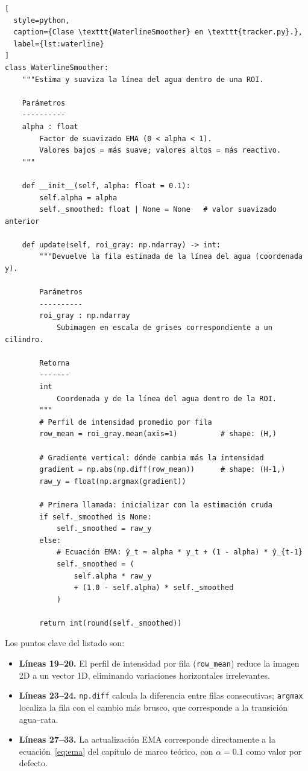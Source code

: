 \begin{lstlisting}[
  style=python,
  caption={Clase \texttt{WaterlineSmoother} en \texttt{tracker.py}.},
  label={lst:waterline}
]
class WaterlineSmoother:
    """Estima y suaviza la línea del agua dentro de una ROI.

    Parámetros
    ----------
    alpha : float
        Factor de suavizado EMA (0 < alpha < 1).
        Valores bajos = más suave; valores altos = más reactivo.
    """

    def __init__(self, alpha: float = 0.1):
        self.alpha = alpha
        self._smoothed: float | None = None   # valor suavizado anterior

    def update(self, roi_gray: np.ndarray) -> int:
        """Devuelve la fila estimada de la línea del agua (coordenada y).

        Parámetros
        ----------
        roi_gray : np.ndarray
            Subimagen en escala de grises correspondiente a un cilindro.

        Retorna
        -------
        int
            Coordenada y de la línea del agua dentro de la ROI.
        """
        # Perfil de intensidad promedio por fila
        row_mean = roi_gray.mean(axis=1)          # shape: (H,)

        # Gradiente vertical: dónde cambia más la intensidad
        gradient = np.abs(np.diff(row_mean))      # shape: (H-1,)
        raw_y = float(np.argmax(gradient))

        # Primera llamada: inicializar con la estimación cruda
        if self._smoothed is None:
            self._smoothed = raw_y
        else:
            # Ecuación EMA: ŷ_t = alpha * y_t + (1 - alpha) * ŷ_{t-1}
            self._smoothed = (
                self.alpha * raw_y
                + (1.0 - self.alpha) * self._smoothed
            )

        return int(round(self._smoothed))
\end{lstlisting}

Los puntos clave del listado son:

\begin{itemize}
    \item \textbf{Líneas 19--20.} El perfil de intensidad por fila
    (\texttt{row\_mean}) reduce la imagen 2D a un vector 1D, eliminando
    variaciones horizontales irrelevantes.

    \item \textbf{Líneas 23--24.} \texttt{np.diff} calcula la diferencia
    entre filas consecutivas; \texttt{argmax} localiza la fila con el cambio
    más brusco, que corresponde a la transición agua--rata.

    \item \textbf{Líneas 27--33.} La actualización EMA corresponde
    directamente a la ecuación~\ref{eq:ema} del capítulo de marco teórico,
    con $\alpha = 0.1$ como valor por defecto.
\end{itemize}


